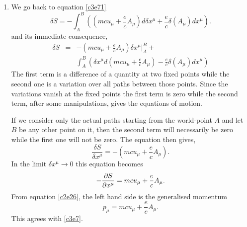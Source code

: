 \begin{enumerate}
\item We go back to equation \eqref{c3e71}
\[
\delta S = -\int_A^B\left((mcu_\mu + \frac{e}{c}A_\mu)d\delta x^\mu + \frac{e}{c}\delta(A_\mu) dx^\mu\right).
\]
and its immediate consequence,
\begin{eqnarray*}
\delta S &=& -\left(mcu_\mu + \frac{e}{c}A_\mu\right)\delta x^\mu\big|_A^B + \\
  & & \int_A^B \left(\delta x^\mu d\left(mcu_\mu + \frac{e}{c}A_\mu\right) - 
 \frac{e}{c}\delta(A_\mu) dx^\mu\right)
\end{eqnarray*}
The first term is a difference of a quantity at two fixed points while the second
one is a variation over all paths between those points. Since the variations 
vanish at the fixed points the first term is zero while the second term, after some
manipulations, gives the equations of motion.

If we consider only the actual paths starting from the world-point $A$ and let $B$
be any other point on it, then the second term will necessarily be zero while the 
first one will not be zero. The equation then gives,
\[
\frac{\delta S}{\delta x^\mu} = -\left(mcu_\mu + \frac{e}{c}A_\mu\right).
\]
In the limit $\delta x^\mu \rightarrow 0$ this equation becomes
\begin{equation}\label{c3e78}
-\frac{\partial{S}}{\partial{x^\mu}} = mcu_\mu + \frac{e}{c}A_\mu.
\end{equation}
From equation \eqref{c2e26}, the left hand side is the generalised momentum
\begin{equation}\label{c3e79}
p_\mu = mcu_\mu + \frac{e}{c}A_\mu.
\end{equation}
This agrees with \eqref{c3e7}.


\end{enumerate}
